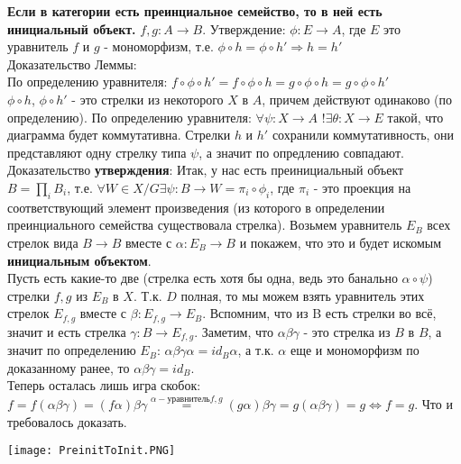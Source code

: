 \documentclass[a4paper]{article}
\theoremstyle{indented}
\theoremstyle{definition}
\theoremstyle{remark}
\DeclareMathOperator{\ra}{\rightarrow}
\DeclareMathOperator{\Ra}{\Rightarrow}
\DeclareMathOperator{\Lra}{\Leftrightarrow}
\begin{document}
\textbf{Если в категории есть преинциальное семейство, то в ней есть инициальный объект.}
\lemma $f, g: A \ra B$. Утверждение: $\phi: E \ra A$, где $E$ это уравнитель $f$ и $g$ - мономорфизм, т.е. $\phi \circ h = \phi \circ h' \Ra h = h'$ \\
Доказательство Леммы: \\
По определению уравнителя: $f \circ \phi \circ h' = f \circ \phi \circ h = g \circ \phi \circ h = g \circ \phi \circ h'$ \\
$\phi \circ h$, $\phi \circ h'$ - это стрелки из некоторого $X$ в $A$, причем действуют одинаково (по определению). По определению уравнителя: $\forall \psi: X \ra A$ $!\exists \theta: X \ra E$ такой, что диаграмма будет коммутативна. Стрелки $h$ и $h'$ сохранили коммутативность, они представляют одну стрелку типа $\psi$, а значит по опредлению совпадают. \\
Доказательство \textbf{утверждения}:
Итак, у нас есть преинициальный объект $B = \prod_i B_i$, т.е. $\forall W \in X / G \exists \psi: B \ra W = \pi_i \circ \phi_i$, где $\pi_i$ - это проекция на соответствующий элемент произведения (из которого в определении преинциального семейства существовала стрелка). Возьмем уравнитель $E_B$ всех стрелок вида $B \ra B$ вместе с $\alpha: E_B \ra B$ и покажем, что это и будет искомым \textbf{инициальным объектом}. \\
Пусть есть какие-то две (стрелка есть хотя бы одна, ведь это банально $\alpha \circ \psi$) стрелки $f, g$ из $E_B$ в $X$. Т.к. $D$ полная, то мы можем взять уравнитель этих стрелок $E_{f, g}$ вместе с $\beta: E_{f, g} \ra E_B$. Вспомним, что из B есть стрелки во всё, значит и есть стрелка $\gamma: B \ra E_{f, g}$. Заметим, что $\alpha\beta\gamma$ - это стрелка из $B$ в $B$, а значит по определению $E_B$: $\alpha\beta\gamma\alpha = id_B\alpha$, а т.к. $\alpha$ еще и мономорфизм по доказанному ранее, то $\alpha\beta\gamma = id_B$. \\
Теперь осталась лишь игра скобок: \\
$f = f(\alpha\beta\gamma) = (f\alpha)\beta\gamma \stackrel{\alpha - уравнитель f, g}{=} (g\alpha)\beta\gamma = g(\alpha\beta\gamma) = g \Lra f = g$. Что и требовалось доказать.
\begin{center}\texttt{[image: PreinitToInit.PNG]}\end{center}
\end{document}
